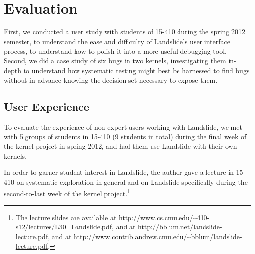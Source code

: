 \chapter{Evaluation}
\label{sec:evaluation}

First, we conducted a user study with students of 15-410 during the spring 2012 semester, to understand the ease and difficulty of Landslide's user interface process, to understand how to polish it into a more useful debugging tool.
Second, we did a case study of six bugs in two kernels, investigating them in-depth to understand how systematic testing might best be harnessed to find bugs without in advance knowing the decision set necessary to expose them.

\section{User Experience}
\label{sec:eval-studence}

To evaluate the experience of non-expert users working with Landslide, we met with 5 groups of students in 15-410 (9 students in total) during the final week of the kernel project in spring 2012, and had them use Landslide with their own kernels. 

In order to garner student interest in Landslide, the author gave a lecture in 15-410 on systematic exploration in general and on Landslide specifically during the second-to-last week of the kernel project.\footnote{
The lecture slides are available at \url{http://www.cs.cmu.edu/~410-s12/lectures/L30_Landslide.pdf}, and at \url{http://bblum.net/landslide-lecture.pdf}, and at \url{http://www.contrib.andrew.cmu.edu/~bblum/landslide-lecture.pdf}.}

